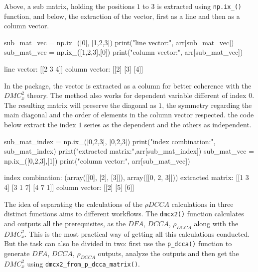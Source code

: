 \documentclass[nojss]{jss}
\begin{document}
Above, a sub matrix, holding the positions $1$ to $3$ is extracted using \verb"np.ix_()" function, and below, the extraction of the vector, first as a line and then as a column vector.
\begin{CodeChunk}

\begin{CodeInput}
sub_mat_vec = np.ix_([0], [1,2,3])
print("line vector:\n", arr[sub_mat_vec])
sub_mat_vec = np.ix_([1,2,3],[0])
print("column vector:\n", arr[sub_mat_vec])
\end{CodeInput}

\begin{CodeOutput}
line vector:
[[2 3 4]]
column vector:
[[2]
[3]
[4]]
\end{CodeOutput}
\end{CodeChunk}

In the  package, the vector is extracted as a column for better coherence with the $DMC_{x}^{2}$ theory. The method also works for dependent variable different of index $0$. The resulting matrix will preserve the diagonal as $1$, the symmetry regarding the main diagonal and the order of elements in the column vector respected. the code below extract the index $1$ series as the dependent and the others as independent.
\begin{CodeChunk}
\begin{CodeInput}
sub_mat_index = np.ix_([0,2,3], [0,2,3])
print("index combination:\n", sub_mat_index)
print("extracted matrix:\n",arr[sub_mat_index])
sub_mat_vec = np.ix_([0,2,3],[1])
print("column vector:\n", arr[sub_mat_vec])
\end{CodeInput}

\begin{CodeOutput}
index combination:
(array([[0],
      [2],
      [3]]), array([[0, 2, 3]]))
extracted matrix:
[[1 3 4]
[3 1 7]
[4 7 1]]
column vector:
[[2]
[5]
[6]]
\end{CodeOutput}
\end{CodeChunk}

The idea of separating the calculations of the $\rho{DCCA}$ calculations in three distinct functions aims to different workflows. The \verb"dmcx2()" function calculates and outputs all the prerequisites, as the $DFA$, $DCCA$, $\rho_{DCCA}$ along with the $DMC_{x}^{2}$. This is the most practical way of getting all this calculations conducted. But the task can also be divided in two: first use the \verb"p_dcca()" function to generate $DFA$, $DCCA$, $\rho_{DCCA}$ outputs, analyze the outputs and then get the $DMC_{x}^{2}$ using \verb"dmcx2_from_p_dcca_matrix()".
\end{document}
